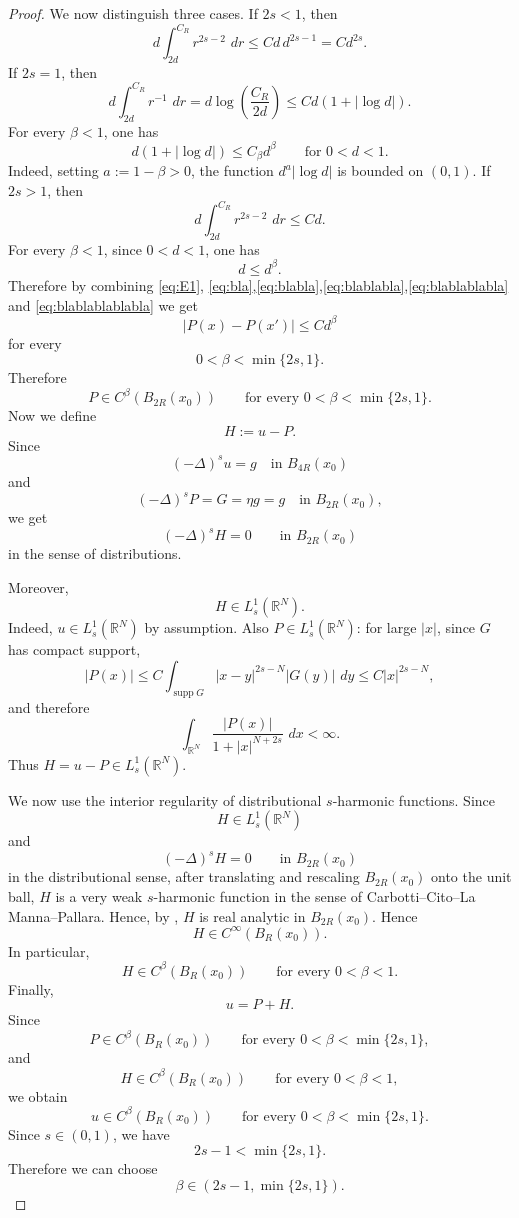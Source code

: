 \documentclass[11pt,a4paper]{article}
\newcommand{\dd}{\,d}
\newcommand{\supp}{\operatorname{supp}}
\begin{document}
\begin{proof}
We now distinguish three cases.
If \(2s<1\), then
\begin{equation}\label{eq:blabla}
d\int_{2d}^{C_R} r^{2s-2}\,\dd r
\le
C d\,d^{2s-1}
=
Cd^{2s}.
\end{equation}
If \(2s=1\), then
\begin{equation}\label{eq:blablabla}
d\int_{2d}^{C_R} r^{-1}\,\dd r
=
d\log\left(\frac{C_R}{2d}\right)
\le
C d(1+|\log d|).
\end{equation}
For every \(\beta<1\), one has
\[
d(1+|\log d|)\le C_\beta d^\beta
\qquad\text{for }0<d<1.
\]
Indeed, setting \(a:=1-\beta>0\), the function \(d^a|\log d|\) is bounded on \((0,1)\).
If \(2s>1\), then
\begin{equation}\label{eq:blablablabla}
d\int_{2d}^{C_R} r^{2s-2}\,\dd r
\le
Cd.
\end{equation}
For every \(\beta<1\), since \(0<d<1\), one has
\begin{equation}\label{eq:blablablablabla}
d\le d^\beta.
\end{equation}
Therefore by combining \eqref{eq:E1}, \eqref{eq:bla},\eqref{eq:blabla},\eqref{eq:blablabla},\eqref{eq:blablablabla} and \eqref{eq:blablablablabla} we get
\[
|P(x)-P(x')|
\le
C d^\beta
\]
for every
\[
0<\beta<\min\{2s,1\}.
\]
Therefore
\[
P\in C^\beta(B_{2R}(x_0))
\qquad
\text{for every }0<\beta<\min\{2s,1\}.
\]
Now we define
\[
H:=u-P.
\]
Since
\[
(-\Delta)^s u=g
\quad\text{in }B_{4R}(x_0)
\]
and
\[
(-\Delta)^s P=G=\eta g=g
\quad\text{in }B_{2R}(x_0),
\]
we get
\[
(-\Delta)^s H=0
\qquad\text{in }B_{2R}(x_0)
\]
in the sense of distributions.

Moreover,
\[
H\in L^1_s(\mathbb R^N).
\]
Indeed, \(u\in L^1_s(\mathbb R^N)\) by assumption. Also
\(P\in L^1_s(\mathbb R^N)\): for large \(|x|\), since \(G\) has compact
support,
\[
|P(x)|
\le
C\int_{\supp G} |x-y|^{2s-N}|G(y)|\,\dd y
\le
C |x|^{2s-N},
\]
and therefore
\[
\int_{\mathbb R^N}
\frac{|P(x)|}{1+|x|^{N+2s}}\,\dd x
<\infty.
\]
Thus \(H=u-P\in L^1_s(\mathbb R^N)\).

We now use the interior regularity of distributional \(s\)-harmonic functions.
Since
\[
H\in L^1_s(\mathbb R^N)
\]
and
\[
(-\Delta)^s H=0
\qquad\text{in }B_{2R}(x_0)
\]
in the distributional sense, after translating and rescaling \(B_{2R}(x_0)\)
onto the unit ball, \(H\) is a very weak \(s\)-harmonic function in the sense of
Carbotti--Cito--La Manna--Pallara. Hence, by
\cite[Main Theorem item (2)]{CarbottiCitoLaMannaPallara},
\(H\) is real analytic in \(B_{2R}(x_0)\). Hence
\[
H\in C^\infty(B_R(x_0)).
\]
In particular,
\[
H\in C^\beta(B_R(x_0))
\qquad
\text{for every }0<\beta<1.
\]
Finally,
\[
u=P+H.
\]
Since
\[
P\in C^\beta(B_R(x_0))
\qquad
\text{for every }0<\beta<\min\{2s,1\},
\]
and
\[
H\in C^\beta(B_R(x_0))
\qquad
\text{for every }0<\beta<1,
\]
we obtain
\[
u\in C^\beta(B_R(x_0))
\qquad
\text{for every }0<\beta<\min\{2s,1\}.
\]
Since \(s\in(0,1)\), we have
\[
2s-1<\min\{2s,1\}.
\]
Therefore we can choose
\[
\beta\in(2s-1,\min\{2s,1\}).
\]
\end{proof}
\end{document}
